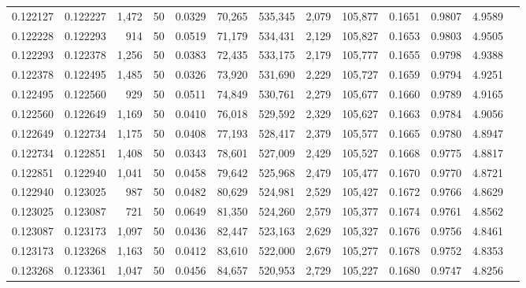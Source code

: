 \begin{tabular}{rrrrrrrrrrrrr}
0.122127 & 0.122227 & 1,472 &  50 &                                     0.0329 &  70,265 & 535,345 &   2,079 & 105,877 & 0.1651 & 0.9807 & 4.9589 \\
0.122228 & 0.122293 &   914 &  50 &                                     0.0519 &  71,179 & 534,431 &   2,129 & 105,827 & 0.1653 & 0.9803 & 4.9505 \\
0.122293 & 0.122378 & 1,256 &  50 &                                     0.0383 &  72,435 & 533,175 &   2,179 & 105,777 & 0.1655 & 0.9798 & 4.9388 \\
0.122378 & 0.122495 & 1,485 &  50 &                                     0.0326 &  73,920 & 531,690 &   2,229 & 105,727 & 0.1659 & 0.9794 & 4.9251 \\
0.122495 & 0.122560 &   929 &  50 &                                     0.0511 &  74,849 & 530,761 &   2,279 & 105,677 & 0.1660 & 0.9789 & 4.9165 \\
0.122560 & 0.122649 & 1,169 &  50 &                                     0.0410 &  76,018 & 529,592 &   2,329 & 105,627 & 0.1663 & 0.9784 & 4.9056 \\
0.122649 & 0.122734 & 1,175 &  50 &                                     0.0408 &  77,193 & 528,417 &   2,379 & 105,577 & 0.1665 & 0.9780 & 4.8947 \\
0.122734 & 0.122851 & 1,408 &  50 &                                     0.0343 &  78,601 & 527,009 &   2,429 & 105,527 & 0.1668 & 0.9775 & 4.8817 \\
0.122851 & 0.122940 & 1,041 &  50 &                                     0.0458 &  79,642 & 525,968 &   2,479 & 105,477 & 0.1670 & 0.9770 & 4.8721 \\
0.122940 & 0.123025 &   987 &  50 &                                     0.0482 &  80,629 & 524,981 &   2,529 & 105,427 & 0.1672 & 0.9766 & 4.8629 \\
0.123025 & 0.123087 &   721 &  50 &                                     0.0649 &  81,350 & 524,260 &   2,579 & 105,377 & 0.1674 & 0.9761 & 4.8562 \\
0.123087 & 0.123173 & 1,097 &  50 &                                     0.0436 &  82,447 & 523,163 &   2,629 & 105,327 & 0.1676 & 0.9756 & 4.8461 \\
0.123173 & 0.123268 & 1,163 &  50 &                                     0.0412 &  83,610 & 522,000 &   2,679 & 105,277 & 0.1678 & 0.9752 & 4.8353 \\
0.123268 & 0.123361 & 1,047 &  50 &                                     0.0456 &  84,657 & 520,953 &   2,729 & 105,227 & 0.1680 & 0.9747 & 4.8256 \\

\end{tabular}
